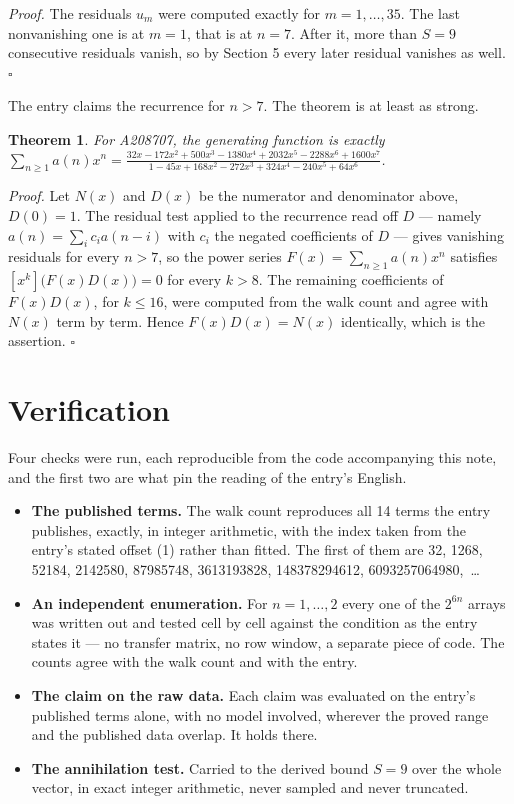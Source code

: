 \documentclass[11pt]{article}
\newtheorem{theorem}{Theorem}
\theoremstyle{definition}
\begin{document}
{\itshape Proof.} The residuals $u_m$ were computed exactly for $m = 1,\dots,35$. The last nonvanishing one is at $m = 1$, that is at $n = 7$. After it, more than $S = 9$ consecutive residuals vanish, so by Section 5 every later residual vanishes as well. $\square$

The entry claims the recurrence for $n > 7$. The theorem is at least as strong.

\begin{theorem} For A208707, the generating function is exactly $\sum_{n\ge 1} a(n)x^n = \frac{32x - 172x^{2} + 500x^{3} - 1380x^{4} + 2032x^{5} - 2288x^{6} + 1600x^{7}}{1 - 45x + 168x^{2} - 272x^{3} + 324x^{4} - 240x^{5} + 64x^{6}}$.\end{theorem}

{\itshape Proof.} Let $N(x)$ and $D(x)$ be the numerator and denominator above, $D(0)=1$. The residual test applied to the recurrence read off $D$ --- namely $a(n) = \sum_i c_i a(n-i)$ with $c_i$ the negated coefficients of $D$ --- gives vanishing residuals for every $n > 7$, so the power series $F(x)=\sum_{n\ge 1}a(n)x^n$ satisfies $[x^k]\bigl(F(x)D(x)\bigr) = 0$ for every $k > 8$. The remaining coefficients of $F(x)D(x)$, for $k \le 16$, were computed from the walk count and agree with $N(x)$ term by term. Hence $F(x)D(x) = N(x)$ identically, which is the assertion. $\square$

\section{Verification}

Four checks were run, each reproducible from the code accompanying this note, and the first two are what pin the reading of the entry's English.

\begin{itemize}

\item {\bfseries The published terms.} The walk count reproduces all 14 terms the entry publishes, exactly, in integer arithmetic, with the index taken from the entry's stated offset (1) rather than fitted. The first of them are 32, 1268, 52184, 2142580, 87985748, 3613193828, 148378294612, 6093257064980,~\dots

\item {\bfseries An independent enumeration.} For $n = 1,\dots,2$ every one of the $2^{6n}$ arrays was written out and tested cell by cell against the condition as the entry states it --- no transfer matrix, no row window, a separate piece of code. The counts agree with the walk count and with the entry.

\item {\bfseries The claim on the raw data.} Each claim was evaluated on the entry's published terms alone, with no model involved, wherever the proved range and the published data overlap. It holds there.

\item {\bfseries The annihilation test.} Carried to the derived bound $S = 9$ over the whole vector, in exact integer arithmetic, never sampled and never truncated.

\end{itemize}
\end{document}
